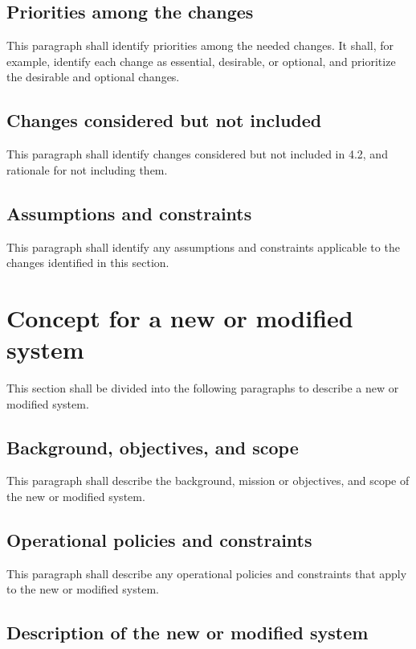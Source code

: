 \subsection{Priorities among the changes}

This paragraph shall identify priorities among the needed changes. It
shall, for example, identify each change as essential, desirable, or
optional, and prioritize the desirable and optional changes.

\subsection{Changes considered but not included}

This paragraph shall identify changes considered but not included in
4.2, and rationale for not including them.

\subsection{Assumptions and constraints}

This paragraph shall identify any assumptions and constraints applicable
to the changes identified in this section.

\section{Concept for a new or modified system}

This section shall be divided into the following paragraphs to describe
a new or modified system.

\subsection{Background, objectives, and scope}

This paragraph shall describe the background, mission or objectives, and
scope of the new or modified system.

\subsection{Operational policies and constraints}

This paragraph shall describe any operational policies and constraints
that apply to the new or modified system.

\subsection{Description of the new or modified system}

